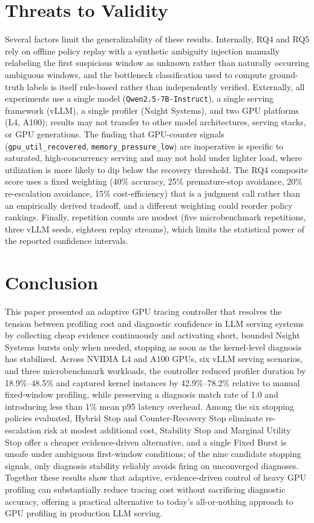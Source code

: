 \section{Threats to Validity}
\label{sec:threats}

Several factors limit the generalizability of these results. Internally, RQ4 and RQ5 rely on offline policy replay with a synthetic ambiguity injection manually relabeling the first suspicious window as unknown rather than naturally occurring ambiguous windows, and the bottleneck classification used to compute ground-truth labels is itself rule-based rather than independently verified. Externally, all experiments use a single model (\texttt{Qwen2.5-7B-Instruct}), a single serving framework (vLLM), a single profiler (Nsight Systems), and two GPU platforms (L4, A100); results may not transfer to other model architectures, serving stacks, or GPU generations. The finding that GPU-counter signals (\texttt{gpu\_util\_recovered}, \texttt{memory\_pressure\_low}) are inoperative is specific to saturated, high-concurrency serving and may not hold under lighter load, where utilization is more likely to dip below the recovery threshold. The RQ4 composite score uses a fixed weighting (40\% accuracy, 25\% premature-stop avoidance, 20\% re-escalation avoidance, 15\% cost-efficiency) that is a judgment call rather than an empirically derived tradeoff, and a different weighting could reorder policy rankings. Finally, repetition counts are modest (five microbenchmark repetitions, three vLLM seeds, eighteen replay streams), which limits the statistical power of the reported confidence intervals.

\section{Conclusion}

This paper presented an adaptive GPU tracing controller that resolves the tension between profiling cost and diagnostic confidence in LLM serving systems by collecting cheap evidence continuously and activating short, bounded Nsight Systems bursts only when needed, stopping as soon as the kernel-level diagnosis has stabilized. Across NVIDIA L4 and A100 GPUs, six vLLM serving scenarios, and three microbenchmark workloads, the controller reduced profiler duration by 18.9\%--48.5\% and captured kernel instances by 42.9\%--78.2\% relative to manual fixed-window profiling, while preserving a diagnosis match rate of 1.0 and introducing less than 1\% mean p95 latency overhead. Among the six stopping policies evaluated, Hybrid Stop and Counter-Recovery Stop eliminate re-escalation risk at modest additional cost, Stability Stop and Marginal Utility Stop offer a cheaper evidence-driven alternative, and a single Fixed Burst is unsafe under ambiguous first-window conditions; of the nine candidate stopping signals, only diagnosis stability reliably avoids firing on unconverged diagnoses. Together these results show that adaptive, evidence-driven control of heavy GPU profiling can substantially reduce tracing cost without sacrificing diagnostic accuracy, offering a practical alternative to today's all-or-nothing approach to GPU profiling in production LLM serving.
